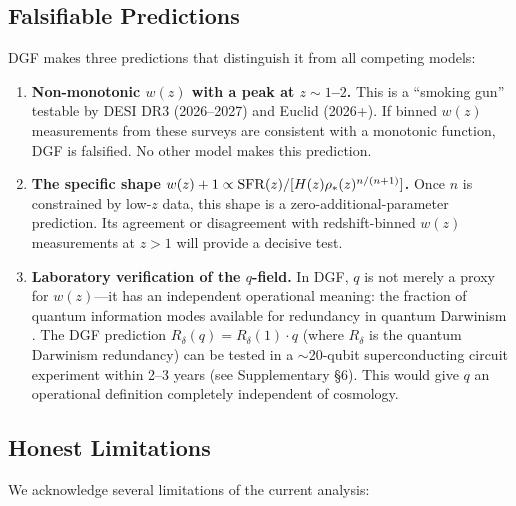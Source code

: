 \documentclass[12pt,a4paper]{article}
\begin{document}
\subsection{Falsifiable Predictions}

DGF makes three predictions that distinguish it from all competing models:

\begin{enumerate}
\item {\bf Non-monotonic $w(z)$ with a peak at $z\sim1$--$2$.} This is a ``smoking gun'' testable by DESI DR3 (2026--2027) and Euclid (2026+). If binned $w(z)$ measurements from these surveys are consistent with a monotonic function, DGF is falsified. No other model makes this prediction.

\item {\bf The specific shape $w(z)+1\propto{\rm SFR}(z)/[H(z)\rho_*(z)^{n/(n+1)}]$.} Once $n$ is constrained by low-$z$ data, this shape is a zero-additional-parameter prediction. Its agreement or disagreement with redshift-binned $w(z)$ measurements at $z>1$ will provide a decisive test.

\item {\bf Laboratory verification of the $q$-field.} In DGF, $q$ is not merely a proxy for $w(z)$---it has an independent operational meaning: the fraction of quantum information modes available for redundancy in quantum Darwinism \cite{zurek2009}. The DGF prediction $R_\delta(q)=R_\delta(1)\cdot q$ (where $R_\delta$ is the quantum Darwinism redundancy) can be tested in a $\sim$20-qubit superconducting circuit experiment within 2--3 years (see Supplementary \S6). This would give $q$ an operational definition completely independent of cosmology.
\end{enumerate}

\subsection{Honest Limitations}

We acknowledge several limitations of the current analysis:
\end{document}

